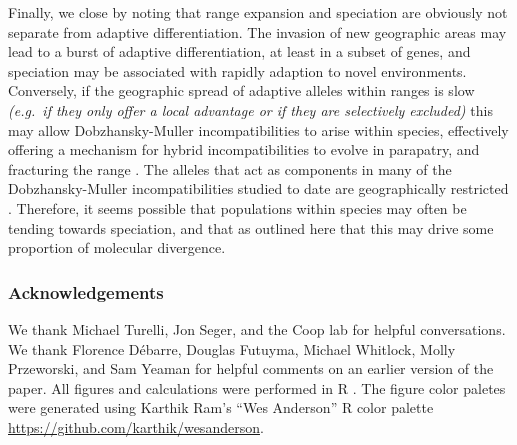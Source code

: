 \documentclass{article}
\newcommand{\mfp}[1]{{\it\color{red}#1}}
\begin{document}
Finally, we close by noting that range expansion and speciation 
are obviously not separate from adaptive differentiation. 
The invasion of new geographic areas may lead to a burst of adaptive differentiation, 
at least in a subset of genes, and speciation may be associated with rapidly adaption to novel environments. 
Conversely, if the geographic spread of adaptive alleles within ranges is slow 
\mfp{(e.g.\ if they only offer a local advantage or if they are selectively excluded)} 
this may allow Dobzhansky-Muller incompatibilities to arise within species, 
effectively offering a mechanism for hybrid incompatibilities to evolve in parapatry,
and fracturing the range \citep{Bank:12,Kondrashov:03,bierne2011coupling}. 
The alleles that act as components in many of the Dobzhansky-Muller incompatibilities studied to date 
are geographically restricted \citep[see][]{Cutter:12}. 
Therefore, it seems possible that populations within species may often be tending towards speciation, 
and that as outlined here that this may drive some proportion of molecular divergence.

\subsubsection*{Acknowledgements}
We thank Michael Turelli, Jon Seger, and the Coop lab for helpful
conversations. We thank Florence D\'ebarre, Douglas Futuyma, Michael   %
Whitlock, Molly Przeworski, and  Sam Yeaman for helpful comments on an
earlier version of the paper. All figures and calculations were
performed in R \citep{R_stats}. The figure color paletes were generated using
Karthik Ram's ``Wes Anderson'' R color palette \url{https://github.com/karthik/wesanderson}.




\end{document}
